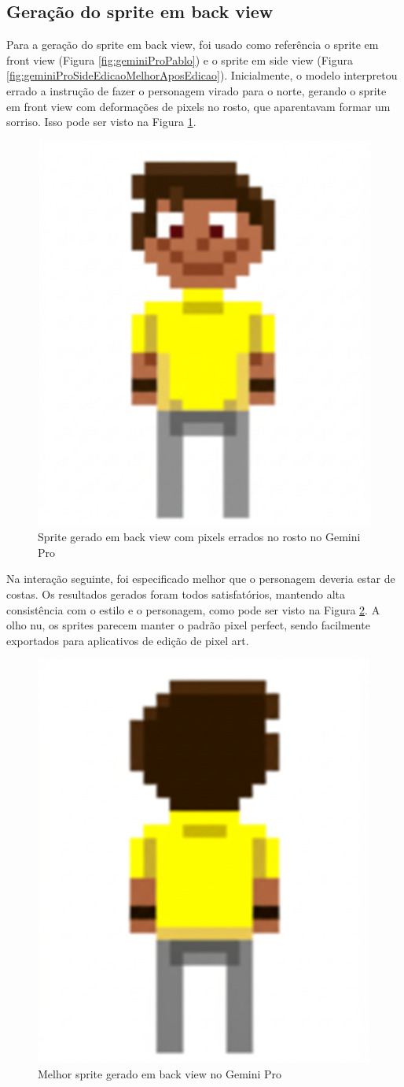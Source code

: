 \FloatBarrier
\subsection{Geração do sprite em back view}
\label{s.gemini.backview}

Para a geração do sprite em back view, foi usado como referência o sprite em front view (Figura \ref{fig:geminiProPablo}) e o sprite em side view (Figura \ref{fig:geminiProSideEdicaoMelhorAposEdicao}). Inicialmente, o modelo interpretou errado a instrução de fazer o personagem virado para o norte, gerando o sprite em front view com deformações de pixels no rosto, que aparentavam formar um sorriso. Isso pode ser visto na Figura \ref{fig:GeminiProSpriteSegundoRosto}.

\begin{figure}[htbp]
    \centering
    \caption{\small Sprite gerado em back view com pixels errados no rosto no Gemini Pro}
    \label{fig:GeminiProSpriteSegundoRosto}
    \includegraphics[width=0.3\linewidth]{figs/geminiPro/chat12/01_res2.png}
\end{figure}

Na interação seguinte, foi especificado melhor que o personagem deveria estar de costas. Os resultados gerados foram todos satisfatórios, mantendo alta consistência com o estilo e o personagem, como pode ser visto na Figura \ref{fig:GeminiProBackMelhor}. A olho nu, os sprites parecem manter o padrão pixel perfect, sendo facilmente exportados para aplicativos de edição de pixel art.

\begin{figure}[htbp]
    \centering
    \caption{\small Melhor sprite gerado em back view no Gemini Pro}
    \label{fig:GeminiProBackMelhor}
    \includegraphics[width=0.3\linewidth]{figs/geminiPro/chat12/02_res2.png}
\end{figure}

